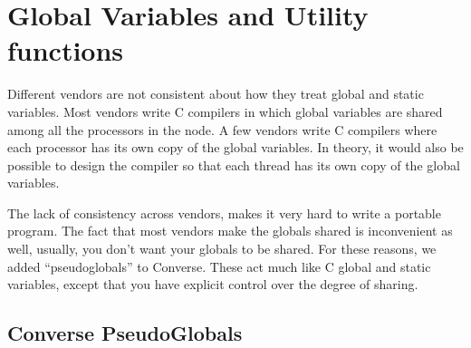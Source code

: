 %
%
%
%
%
%
%
%
%
%
%
%
%
%

\section{Global Variables and Utility functions}
\label{globalvars}

Different vendors are not consistent about how they treat global and static
variables.  Most vendors write C compilers in which global variables are
shared among all the processors in the node.  A few vendors write C
compilers where each processor has its own copy of the global variables.
In theory, it would also be possible to design the compiler so that
each thread has its own copy of the global variables.

The lack of consistency across vendors, makes it very hard to write a
portable program.  The fact that most vendors make the globals shared
is inconvenient as well, usually, you don't want your globals to be
shared.  For these reasons, we added ``pseudoglobals'' to Converse.
These act much like C global and static variables, except that you have
explicit control over the degree of sharing.

\subsection{Converse PseudoGlobals}

